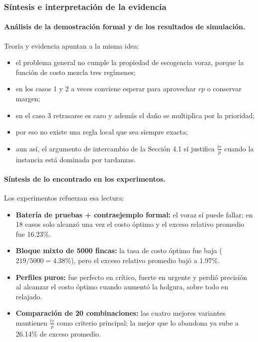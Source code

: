 \documentclass[12pt,a4paper]{article}
\begin{document}
\subsubsection{S\'intesis e interpretaci\'on de la evidencia}

\paragraph{An\'alisis de la demostraci\'on formal y de los resultados de simulaci\'on.}
Teor\'ia y evidencia apuntan a la misma idea:
\begin{itemize}
  \item el problema general no cumple la propiedad de escogencia voraz, porque la funci\'on de costo mezcla tres reg\'imenes;
  \item en los casos 1 y 2 a veces conviene esperar para aprovechar \(rp\) o conservar margen;
  \item en el caso 3 retrasarse es caro y adem\'as el da\~no se multiplica por la prioridad;
  \item por eso no existe una regla local que sea siempre exacta;
  \item aun as\'i, el argumento de intercambio de la Secci\'on 4.1 s\'i justifica \(\frac{tr}{p}\) cuando la instancia est\'a dominada por tardanzas.
\end{itemize}

\paragraph{S\'intesis de lo encontrado en los experimentos.}
Los experimentos refuerzan esa lectura:
\begin{itemize}
  \item \textbf{Bater\'ia de pruebas + contraejemplo formal:} el voraz s\'i puede fallar; en 18 casos solo alcanz\'o una vez el costo \'optimo y el exceso relativo promedio fue 16.23\%.
  \item \textbf{Bloque mixto de 5000 fincas:} la tasa de costo \'optimo fue baja (\(219/5000 = 4.38\%\)), pero el exceso relativo promedio baj\'o a 1.97\%.
  \item \textbf{Perfiles puros:} fue perfecto en cr\'itico, fuerte en urgente y perdi\'o precisi\'on al alcanzar el costo \'optimo cuando aument\'o la holgura, sobre todo en relajado.
  \item \textbf{Comparaci\'on de 20 combinaciones:} las cuatro mejores variantes mantienen \(\frac{tr}{p}\) como criterio principal; la mejor que lo abandona ya sube a 26.14\% de exceso promedio.
\end{itemize}
\end{document}
